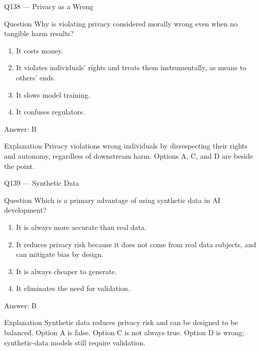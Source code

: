 \documentclass[aspectratio=169,8pt]{beamer}
\begin{document}
\begin{frame}{Q138 --- Privacy as a Wrong}
\begin{block}{Question}
Why is violating privacy considered morally wrong even when no tangible harm results?
\begin{enumerate}
\item It costs money.
\item It violates individuals' rights and treats them instrumentally, as means to others' ends.
\item It slows model training.
\item It confuses regulators.
\end{enumerate} 	\end{block}
\begin{exampleblock}{Answer: B}\end{exampleblock}
\begin{block}{Explanation}
Privacy violations wrong individuals by disrespecting their rights and autonomy, regardless of downstream harm. Options A, C, and D are beside the point.
\end{block}
\end{frame}

\begin{frame}{Q139 --- Synthetic Data}
\begin{block}{Question}
Which is a primary advantage of using synthetic data in AI development?
\begin{enumerate}
\item It is always more accurate than real data.
\item It reduces privacy risk because it does not come from real data subjects, and can mitigate bias by design.
\item It is always cheaper to generate.
\item It eliminates the need for validation.
\end{enumerate} 	\end{block}
\begin{exampleblock}{Answer: B}\end{exampleblock}
\begin{block}{Explanation}
Synthetic data reduces privacy risk and can be designed to be balanced. Option A is false. Option C is not always true. Option D is wrong; synthetic-data models still require validation.
\end{block}
\end{frame}
\end{document}
